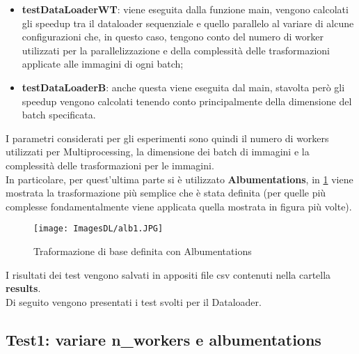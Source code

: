 \documentclass[10pt,twocolumn,letterpaper]{article}
\newcommand{\bit} {\begin{itemize} }
\newcommand{\eit} {\end{itemize} }
\begin{document}
\bit
    \item{\textbf{testDataLoaderWT}: viene eseguita dalla funzione main, vengono calcolati gli speedup tra il dataloader sequenziale e quello parallelo al variare di alcune configurazioni che, in questo caso, tengono conto del numero di worker utilizzati per la parallelizzazione e della complessità delle trasformazioni applicate alle immagini di ogni batch;}
    \item{\textbf{testDataLoaderB}: anche questa viene eseguita dal main, stavolta però gli speedup vengono calcolati tenendo conto principalmente della dimensione del batch specificata.}
\eit

I parametri considerati per gli esperimenti sono quindi il numero di workers utilizzati per Multiprocessing, la dimensione dei batch di immagini e la complessità delle trasformazioni per le immagini.\\
In particolare, per quest'ultima parte si è utilizzato \textbf{Albumentations}, in \cref{fig:alb1} viene mostrata la trasformazione più semplice che è stata definita (per quelle più complesse fondamentalmente viene applicata quella mostrata in figura più volte).

\begin{figure}[h]
    \centering
    \texttt{[image: ImagesDL/alb1.JPG]}
    \caption{Traformazione di base definita con Albumentations}
    \label{fig:alb1}
\end{figure}

I risultati dei test vengono salvati in appositi file csv contenuti nella cartella \textbf{results}.\\
Di seguito vengono presentati i test svolti per il Dataloader.


\subsection{Test1: variare n\_workers e albumentations}
\end{document}
